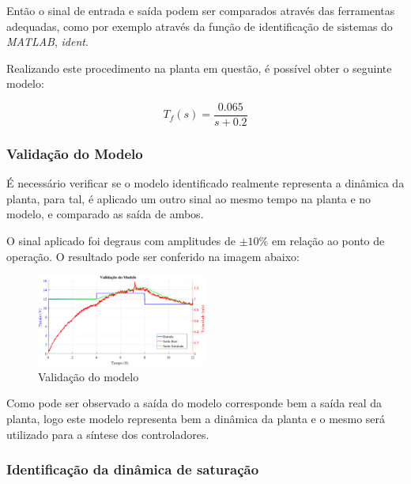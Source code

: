 \documentclass[conference,harvard,brazil,english]{sbatex}
\begin{document}
                Então o sinal de entrada e saída podem ser comparados através das ferramentas adequadas, como por exemplo através da função de identificação de sistemas do \textit{MATLAB}, \textit{ident}.
                
                Realizando este procedimento na planta em questão, é possível obter o seguinte modelo:
            
                \begin{equation}
                    \label{equ:modelo}
                    T_f(s) = \frac{0.065}{s + 0.2}
                \end{equation}
                
            \subsubsection{Validação do Modelo}
                
                É necessário verificar se o modelo identificado realmente representa a dinâmica da planta, para tal, é aplicado um outro sinal ao mesmo tempo na planta e no modelo, e comparado as saída de ambos.
                
                O sinal aplicado foi degraus com amplitudes de $\pm10\%$ em relação ao ponto de operação. O resultado pode ser conferido na imagem abaixo:
                
                \begin{figure}[H]
                    \centering
                    \includegraphics[width=0.5\textwidth]{imagens/identValidSat/validacaoDoModelo.eps}
                    \caption{Validação do modelo}
                    \label{fig:validacao}
                \end{figure}
                
                Como pode ser observado a saída do modelo corresponde bem a saída real da planta, logo este modelo representa bem a dinâmica da planta e o mesmo será utilizado para a síntese dos controladores.
    
            \subsubsection{Identificação da dinâmica de saturação}
                
\end{document}

